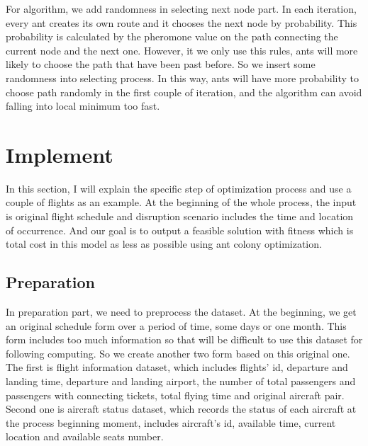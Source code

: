 \documentclass[senior]{IPSstyle}
\begin{document}
For algorithm, we add randomness in selecting next node part. In each iteration, every ant creates its own route and it chooses the next node by probability. This probability is calculated by the pheromone value on the path connecting the current node and the next one. However, it we only use this rules, ants will more likely to choose the path that have been past before. So we insert some randomness into selecting process. In this way, ants will have more probability to choose path randomly in the first couple of iteration, and the algorithm can avoid falling into local minimum too fast.




\chapter{Implement} \label{implement}
In this section, I will explain the specific step of optimization process and use a couple of flights as an example. At the beginning of the whole process, the input is original flight schedule and disruption scenario includes the time and location of occurrence. And our goal is to output a feasible solution with fitness which is total cost in this model as less as possible using ant colony optimization.

\section{Preparation}

In preparation part, we need to preprocess the dataset. At the beginning, we get an original schedule form over a period of time, some days or one month. This form includes too much information so that will be difficult to use this dataset for following computing. So we create another two form based on this original one. The first is flight information dataset, which includes flights’ id, departure and landing time, departure and landing airport, the number of total passengers and passengers with connecting tickets, total flying time and original aircraft pair. Second one is aircraft status dataset, which records the status of each aircraft at the process beginning moment, includes aircraft's id, available time, current location and available seats number.
\end{document}
